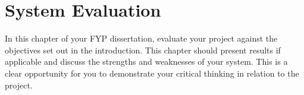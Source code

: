 \chapter{System Evaluation} \label{cha:systemeval}
In this chapter of your FYP dissertation, evaluate your project against the
objectives set out in the introduction. This chapter should present results if
applicable and discuss the strengths and weaknesses of your system. This is a
clear opportunity for you to demonstrate your critical thinking in relation to
the project.

